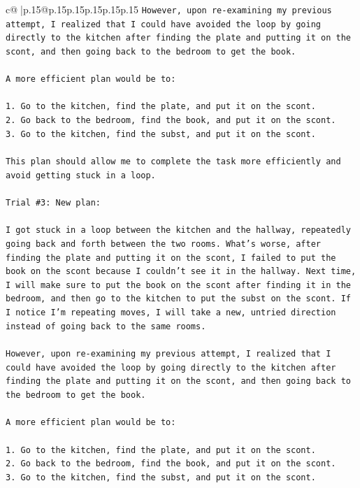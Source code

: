 \documentclass{article}
\begin{document}
{\begin{supertabular}{c@{$\;$}|p{.15\linewidth}@{}p{.15\linewidth}p{.15\linewidth}p{.15\linewidth}p{.15\linewidth}p{.15\linewidth}}
{{{\texttt{However, upon re{-}examining my previous attempt, I realized that I could have avoided the loop by going directly to the kitchen after finding the plate and putting it on the scont, and then going back to the bedroom to get the book. } \\
\\ 
\texttt{A more efficient plan would be to:} \\
\\ 
\texttt{1. Go to the kitchen, find the plate, and put it on the scont.} \\
\texttt{2. Go back to the bedroom, find the book, and put it on the scont.} \\
\texttt{3. Go to the kitchen, find the subst, and put it on the scont.} \\
\\ 
\texttt{This plan should allow me to complete the task more efficiently and avoid getting stuck in a loop.} \\
\\ 
\texttt{Trial \#3: New plan: } \\
\\ 
\texttt{I got stuck in a loop between the kitchen and the hallway, repeatedly going back and forth between the two rooms. What's worse, after finding the plate and putting it on the scont, I failed to put the book on the scont because I couldn't see it in the hallway. Next time, I will make sure to put the book on the scont after finding it in the bedroom, and then go to the kitchen to put the subst on the scont. If I notice I'm repeating moves, I will take a new, untried direction instead of going back to the same rooms.} \\
\\ 
\texttt{However, upon re{-}examining my previous attempt, I realized that I could have avoided the loop by going directly to the kitchen after finding the plate and putting it on the scont, and then going back to the bedroom to get the book. } \\
\\ 
\texttt{A more efficient plan would be to:} \\
\\ 
\texttt{1. Go to the kitchen, find the plate, and put it on the scont.} \\
\texttt{2. Go back to the bedroom, find the book, and put it on the scont.} \\
\texttt{3. Go to the kitchen, find the subst, and put it on the scont.} \\
\\ 
}}}
\end{supertabular}}
\end{document}
